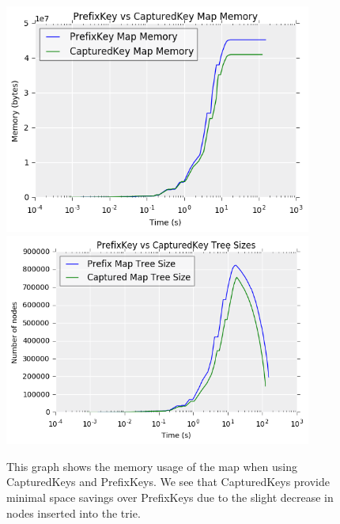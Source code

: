 \begin{figure}[t!]
\begin{center}
\includegraphics[width=0.9\textwidth]{figs/prefix-captured_pmap_mem.png}
\includegraphics[width=0.9\textwidth]{figs/prefix-captured_tree_size.png}
\end{center}
\caption{This graph shows the memory usage of the map when using CapturedKeys and PrefixKeys. 
We see that CapturedKeys provide minimal space savings over PrefixKeys due to the slight decrease in nodes inserted into the trie.}
\label{fig:prefix-captured}
\end{figure}


